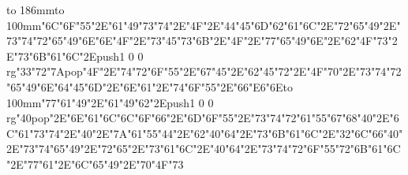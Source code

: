 \hbox to 186mm{\hsize=81mm\vbox to 100mm{\vfill\ipa\char"6C\ipa\char"6F\ipa\char"55\ipa\char"2E\ipa\char"61\ipa\char"49\ipa\char"73\ipa\char"74\ipa\char"2E\ipa\char"4F\ipa\char"2E\ipa\char"44\ipa\char"45\ipa\char"6D\medskip\ipa\char"62\ipa\char"61\ipa\char"6C\ipa\char"2E\ipa\char"72\ipa\char"65\ipa\char"49\ipa\char"2E\ipa\char"73\ipa\char"74\ipa\char"72\ipa\char"65\ipa\char"49\ipa\char"6E\medskip\ipa\char"6E\ipa\char"4F\ipa\char"2E\ipa\char"73\ipa\char"45\ipa\char"73\ipa\char"6B\ipa\char"2E\ipa\char"4F\ipa\char"2E\ipa\char"77\ipa\char"65\ipa\char"49\ipa\char"6E\ipa\char"2E\ipa\char"62\ipa\char"4F\ipa\char"73\ipa\char"2E\ipa\char"73\ipa\char"6B\ipa\char"61\ipa\char"6C\ipa\char"2E\pdfcolorstack\match push{1 0 0 rg}\ipa\char"33\ipa\char"72\ipa\char"7A\pdfcolorstack\match pop{}\medskip\ipa\char"4F\ipa\char"2E\ipa\char"74\ipa\char"72\ipa\char"6F\ipa\char"55\ipa\char"2E\ipa\char"67\ipa\char"45\ipa\char"2E\ipa\char"62\ipa\char"45\ipa\char"72\ipa\char"2E\ipa\char"4F\ipa\char"70\ipa\char"2E\ipa\char"73\ipa\char"74\ipa\char"72\ipa\char"65\ipa\char"49\ipa\char"6E\medskip\ipa\char"64\ipa\char"45\ipa\char"6D\ipa\char"2E\ipa\char"6E\ipa\char"61\ipa\char"2E\ipa\char"74\ipa\char"6F\ipa\char"55\ipa\char"2E\ipa\char"66\ipa\char"E6\ipa\char"6E\vfill}\hfill\vbox to 100mm{\vfill\ipa\char"77\ipa\char"61\ipa\char"49\ipa\char"2E\ipa\char"61\ipa\char"49\ipa\char"62\ipa\char"2E\pdfcolorstack\match push{1 0 0 rg}\ipa\char"40\pdfcolorstack\match pop{}\ipa\char"2E\ipa\char"6E\ipa\char"61\ipa\char"6C\medskip\ipa\char"6C\ipa\char"6F\ipa\char"66\ipa\char"2E\ipa\char"6D\ipa\char"6F\ipa\char"55\ipa\char"2E\ipa\char"73\ipa\char"74\ipa\char"72\ipa\char"61\ipa\char"55\ipa\char"67\medskip\ipa\char"68\ipa\char"40\ipa\char"2E\ipa\char"6C\ipa\char"61\ipa\char"73\ipa\char"74\ipa\char"2E\ipa\char"40\ipa\char"2E\ipa\char"7A\ipa\char"61\ipa\char"55\ipa\char"44\ipa\char"2E\ipa\char"62\ipa\char"40\ipa\char"64\ipa\char"2E\ipa\char"73\ipa\char"6B\ipa\char"61\ipa\char"6C\ipa\char"2E\ipa\char"32\ipa\char"6C\ipa\char"66\medskip\ipa\char"40\ipa\char"2E\ipa\char"73\ipa\char"74\ipa\char"65\ipa\char"49\ipa\char"2E\ipa\char"72\ipa\char"65\ipa\char"2E\ipa\char"73\ipa\char"61\ipa\char"6C\ipa\char"2E\ipa\char"40\ipa\char"64\ipa\char"2E\ipa\char"73\ipa\char"74\ipa\char"72\ipa\char"6F\ipa\char"55\ipa\char"72\medskip\ipa\char"6B\ipa\char"61\ipa\char"6C\ipa\char"2E\ipa\char"77\ipa\char"61\ipa\char"2E\ipa\char"6C\ipa\char"65\ipa\char"49\ipa\char"2E\ipa\char"70\ipa\char"4F\ipa\char"73\vfill}}\eject
